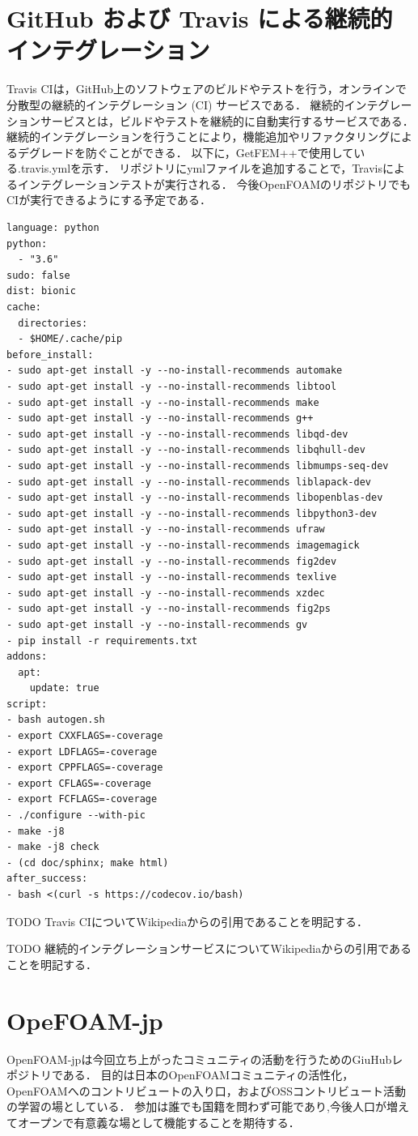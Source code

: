\documentclass{ltjoc}
\begin{document}
\section{GitHub および Travis による継続的インテグレーション}
Travis CIは，GitHub上のソフトウェアのビルドやテストを行う，オンラインで分散型の継続的インテグレーション (CI) サービスである．
継続的インテグレーションサービスとは，ビルドやテストを継続的に自動実行するサービスである．
継続的インテグレーションを行うことにより，機能追加やリファクタリングによるデグレードを防ぐことができる．
以下に，GetFEM++で使用している.travis.ymlを示す．
リポジトリにymlファイルを追加することで，Travisによるインテグレーションテストが実行される．
今後OpenFOAMのリポジトリでもCIが実行できるようにする予定である．
\begin{lstlisting}
language: python
python:
  - "3.6"
sudo: false
dist: bionic
cache:
  directories:
  - $HOME/.cache/pip
before_install:
- sudo apt-get install -y --no-install-recommends automake
- sudo apt-get install -y --no-install-recommends libtool
- sudo apt-get install -y --no-install-recommends make
- sudo apt-get install -y --no-install-recommends g++
- sudo apt-get install -y --no-install-recommends libqd-dev
- sudo apt-get install -y --no-install-recommends libqhull-dev
- sudo apt-get install -y --no-install-recommends libmumps-seq-dev
- sudo apt-get install -y --no-install-recommends liblapack-dev
- sudo apt-get install -y --no-install-recommends libopenblas-dev
- sudo apt-get install -y --no-install-recommends libpython3-dev
- sudo apt-get install -y --no-install-recommends ufraw
- sudo apt-get install -y --no-install-recommends imagemagick
- sudo apt-get install -y --no-install-recommends fig2dev
- sudo apt-get install -y --no-install-recommends texlive
- sudo apt-get install -y --no-install-recommends xzdec
- sudo apt-get install -y --no-install-recommends fig2ps
- sudo apt-get install -y --no-install-recommends gv
- pip install -r requirements.txt
addons:
  apt:
    update: true
script:
- bash autogen.sh
- export CXXFLAGS=-coverage
- export LDFLAGS=-coverage
- export CPPFLAGS=-coverage
- export CFLAGS=-coverage
- export FCFLAGS=-coverage
- ./configure --with-pic
- make -j8
- make -j8 check
- (cd doc/sphinx; make html)
after_success:
- bash <(curl -s https://codecov.io/bash)
\end{lstlisting}

TODO Travis CIについてWikipediaからの引用であることを明記する．

TODO 継続的インテグレーションサービスについてWikipediaからの引用であることを明記する．
%
\section{OpeFOAM-jp}
OpenFOAM-jp\cite{URL:OpenFOAM-jp}は今回立ち上がったコミュニティの活動を行うためのGiuHubレポジトリである．
目的は日本のOpenFOAMコミュニティの活性化，OpenFOAMへのコントリビュートの入り口，およびOSSコントリビュート活動の学習の場としている．
参加は誰でも国籍を問わず可能であり,今後人口が増えてオープンで有意義な場として機能することを期待する．
%
\end{document}
